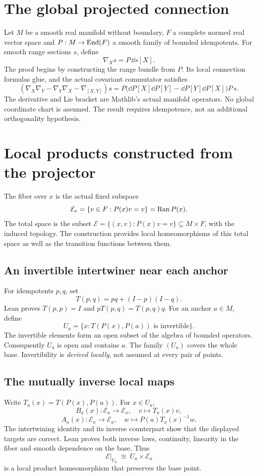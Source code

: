 \section{The global projected connection}\label{supp6:section:001}
Let $M$ be a smooth real manifold without boundary, $F$ a complete normed real vector space and $P:M\to\operatorname{End}(F)$ a smooth family of bounded idempotents. For smooth range sections $s$, define
\[
\nabla_Xs=P\,\dd s[X].
\]
The proof begins by constructing the range bundle from $P$. Its local connection formulas glue, and the actual covariant commutator satisfies
\[
\boxed{(\nabla_X\nabla_Y-\nabla_Y\nabla_X-\nabla_{[X,Y]})s
=P\bigl(\dd P[X]\dd P[Y]-\dd P[Y]\dd P[X]\bigr)P\,s.}
\]
The derivative and Lie bracket are Mathlib's actual manifold operators. No global coordinate chart is assumed. The result requires idempotence, not an additional orthogonality hypothesis.


\section{Local products constructed from the projector}\label{supp6:section:002}
The fiber over $x$ is the actual fixed subspace
\[
\mathcal E_x=\{v\in F:P(x)v=v\}=\Ran P(x).
\]
The total space is the subset $\mathcal E=\{(x,v):P(x)v=v\}\subseteq M\times F$, with the induced topology. The construction provides local homeomorphisms of this total space as well as the transition functions between them.

\subsection{An invertible intertwiner near each anchor}
For idempotents $p,q$, set
\[
T(p,q)=pq+(I-p)(I-q).
\]
Lean proves $T(p,p)=I$ and $pT(p,q)=T(p,q)q$. For an anchor $a\in M$, define
\[
U_a=\{x:T(P(x),P(a))\text{ is invertible}\}.
\]
The invertible elements form an open subset of the algebra of bounded operators. Consequently $U_a$ is open and contains $a$. The family $(U_a)$ covers the whole base. Invertibility is \emph{derived locally}, not assumed at every pair of points.

\subsection{The mutually inverse local maps}
Write $T_a(x)=T(P(x),P(a))$. For $x\in U_a$,
\[
B_a(x):\mathcal E_a\longrightarrow\mathcal E_x,
\quad v\longmapsto T_a(x)v,
\]
\[
A_a(x):\mathcal E_x\longrightarrow\mathcal E_a,
\quad w\longmapsto P(a)T_a(x)^{-1}w.
\]
The intertwining identity and its inverse counterpart show that the displayed targets are correct. Lean proves both inverse laws, continuity, linearity in the fiber and smooth dependence on the base. Thus
\[
\mathcal E|_{U_a}\ \cong\ U_a\times\mathcal E_a
\]
is a local product homeomorphism that preserves the base point.

